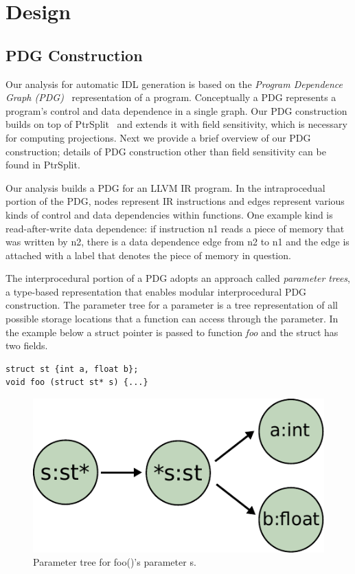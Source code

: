 \documentclass[pageno]{jpaper}
\begin{document}
\section{Design}
\subsection{PDG Construction}
Our analysis for automatic IDL generation is based on the
\textit{Program Dependence Graph (PDG)}~\cite{Ferrante87PDG}
representation of a program. Conceptually a PDG represents
a program's control and data dependence in a single graph.
Our PDG construction builds on top of
PtrSplit~\cite{LiuTJ17Ptrsplit} and extends it with field sensitivity,
which is necessary for computing projections.  Next we provide a brief
overview of our PDG construction; details of PDG construction other
than field sensitivity can be found in PtrSplit.

Our analysis builds a PDG for an LLVM IR program. In the intraprocedual
portion of the PDG, nodes represent IR instructions and edges represent
various kinds of control and data dependencies within functions.  One
example kind is read-after-write data dependence: if instruction
n1 reads a piece of memory that was written by n2, there is a data
dependence edge from n2 to n1 and the edge is attached with a label
that denotes the piece of memory in question.

The interprocedural portion of a PDG adopts an approach called
\textit{parameter trees}, a type-based representation that enables
modular interprocedural PDG construction. The parameter tree for a
parameter is a tree representation of all possible
storage locations that a function can access through the parameter. 
%
In the example below a struct pointer is passed to function \textit{foo} and the
struct has two fields.
\begin{lstlisting}[label=lst:hierarchies] 
struct st {int a, float b};
void foo (struct st* s) {...}
\end{lstlisting}

\begin{figure}[t]
   \centering
   \includegraphics[width=0.4\columnwidth]{figs/parameter_tree_example-a}
	\caption{Parameter tree for foo()'s parameter s.}
   \label{fig:parameter_tree}
\end{figure}
\end{document}

